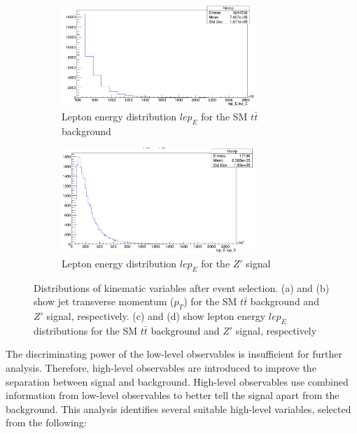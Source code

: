 \begin{figure}[H]
    \begin{subfigure}[b]{0.48\textwidth}
        \centering
        \includegraphics[width=0.8\textwidth]{Figure/low_elep_tt.png}
        \caption{Lepton energy distribution \(lep_E\) for the SM \(t\bar{t}\) background}
        \label{fig:bplus_mass_2}
    \end{subfigure}
    \hfill
    \begin{subfigure}[b]{0.48\textwidth}
        \centering
        \includegraphics[width=0.8\textwidth]{Figure/low_elep_Z.png}
        \caption{Lepton energy distribution \(lep_E\) for the \(Z'\) signal}
        \label{fig:bminus_mass_2}
    \end{subfigure}

    \caption{
    Distributions of kinematic variables after event selection. (a) and (b) show jet transverse momentum (\(p_T\)) for the SM \(t\bar{t}\) background and \(Z'\) signal, respectively. (c) and (d) show lepton energy \(lep_E\) distributions for the SM \(t\bar{t}\) background and \(Z'\) signal, respectively}
    \label{fig:plot_event}
\end{figure}



    The discriminating power of the low-level observables is insufficient for further analysis. Therefore, high-level observables are introduced to improve the separation between signal and background. High-level observables use combined information from low-level observables to better tell the signal apart from the background. This analysis identifies several suitable high-level variables, selected from the following:


